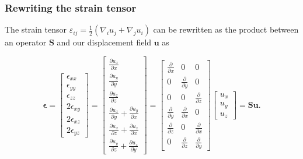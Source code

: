 \documentclass[acmtog]{acmart}
\begin{document}
\subsubsection{Rewriting the strain tensor}
The strain tensor $\varepsilon_{ij} = \frac{1}{2} ( \nabla_i u_j + \nabla_j
  u_i)$ can be rewritten as the product between an operator $\boldsymbol S$ and
our displacement field $\boldsymbol u$ as

%
\begin{equation}
  \boldsymbol \epsilon = \begin{bmatrix}
    \epsilon_{xx}   \\
    \epsilon_{yy}   \\
    \epsilon_{zz}   \\
    2 \epsilon_{xy} \\
    2 \epsilon_{xz} \\
    2 \epsilon_{yz}
  \end{bmatrix} = \begin{bmatrix}
    \displaystyle \frac{ \partial u_x }{ \partial x }                                       \\
    \displaystyle \frac{ \partial u_y }{ \partial y }                                       \\
    \displaystyle \frac{ \partial u_z }{ \partial z }                                       \\
    \displaystyle \frac{ \partial u_x }{ \partial y } + \frac{ \partial u_y }{ \partial x } \\
    \displaystyle \frac{ \partial u_x }{ \partial z } + \frac{ \partial u_z }{ \partial x } \\
    \displaystyle \frac{ \partial u_y }{ \partial z } + \frac{ \partial u_z }{ \partial y }
  \end{bmatrix} = \begin{bmatrix}
    \displaystyle \frac{ \partial  }{ \partial x } & \displaystyle 0                                & \displaystyle 0                                \\
    \displaystyle 0                                & \displaystyle \frac{ \partial  }{ \partial y } & \displaystyle 0                                \\
    \displaystyle 0                                & \displaystyle 0                                & \displaystyle \frac{ \partial  }{ \partial z } \\
    \displaystyle \frac{ \partial  }{ \partial y } & \displaystyle \frac{ \partial  }{ \partial x } & \displaystyle 0                                \\
    \displaystyle \frac{ \partial  }{ \partial z } & \displaystyle 0                                & \displaystyle \frac{ \partial  }{ \partial x } \\
    \displaystyle 0                                & \displaystyle \frac{ \partial  }{ \partial z } & \displaystyle \frac{ \partial  }{ \partial y }
  \end{bmatrix} \begin{bmatrix}
    u_x \\
    u_y \\
    u_z
  \end{bmatrix} = \boldsymbol S \boldsymbol u.
\end{equation}
%
\end{document}
